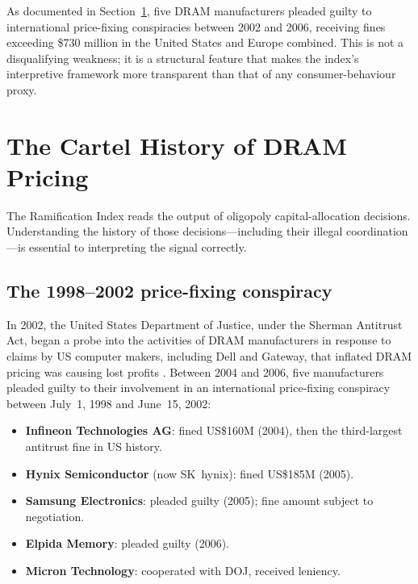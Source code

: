\documentclass[12pt]{article}
\theoremstyle{definition}
\begin{document}
As documented in Section~\ref{sec:cartel}, five DRAM manufacturers pleaded guilty to international price-fixing conspiracies between 2002 and 2006, receiving fines exceeding \$730 million in the United States and Europe combined. This is not a disqualifying weakness; it is a structural feature that makes the index's interpretive framework more transparent than that of any consumer-behaviour proxy.


\section{The Cartel History of DRAM Pricing}
\label{sec:cartel}

The Ramification Index reads the output of oligopoly capital-allocation decisions. Understanding the history of those decisions---including their illegal coordination---is essential to interpreting the signal correctly.

\subsection{The 1998--2002 price-fixing conspiracy}

In 2002, the United States Department of Justice, under the Sherman Antitrust Act, began a probe into the activities of DRAM manufacturers in response to claims by US computer makers, including Dell and Gateway, that inflated DRAM pricing was causing lost profits \cite{DOJ2006}. Between 2004 and 2006, five manufacturers pleaded guilty to their involvement in an international price-fixing conspiracy between July~1, 1998 and June~15, 2002:

\begin{itemize}[itemsep=2pt]
\item \textbf{Infineon Technologies AG}: fined US\$160M (2004), then the third-largest antitrust fine in US history.
\item \textbf{Hynix Semiconductor} (now SK~hynix): fined US\$185M (2005).
\item \textbf{Samsung Electronics}: pleaded guilty (2005); fine amount subject to negotiation.
\item \textbf{Elpida Memory}: pleaded guilty (2006).
\item \textbf{Micron Technology}: cooperated with DOJ, received leniency.
\end{itemize}
\end{document}
